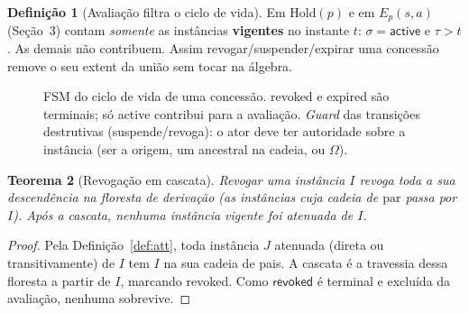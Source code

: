 \documentclass[11pt,a4paper]{article}
\newtheorem{theorem}{Teorema}
\theoremstyle{definition}
\newtheorem{definition}[theorem]{Definição}
\begin{document}
  \begin{definition}[Avaliação filtra o ciclo de vida]
  Em $\mathrm{Hold}(p)$ e em $E_p(s,a)$ (Seção~3) contam \emph{somente} as
  instâncias \textbf{vigentes} no instante $t$: $\sigma=\textsf{active}$ e
  $\tau>t$. As demais não contribuem. Assim revogar/suspender/expirar uma
  concessão remove o seu extent da união sem tocar na álgebra.
  \end{definition}

  \begin{figure}[h]
  \centering
  \caption{FSM do ciclo de vida de uma concessão. \textsf{revoked} e
  \textsf{expired} são terminais; só \textsf{active} contribui para a
  avaliação. \emph{Guard} das transições destrutivas (suspende/revoga): o ator
  deve ter autoridade sobre a instância (ser a origem, um ancestral na cadeia,
  ou $\Omega$).}
  \label{fig:fsm}
  \end{figure}

  \begin{theorem}[Revogação em cascata]\label{thm:cascade}
  Revogar uma instância $I$ revoga toda a sua descendência na floresta de
  derivação (as instâncias cuja cadeia de $\mathrm{par}$ passa por $I$). Após a
  cascata, nenhuma instância vigente foi atenuada de $I$.
  \end{theorem}
  \begin{proof}
  Pela Definição~\ref{def:att}, toda instância $J$ atenuada (direta ou
  transitivamente) de $I$ tem $I$ na sua cadeia de pais. A cascata é a travessia
  dessa floresta a partir de $I$, marcando \textsf{revoked}. Como
  $\textsf{revoked}$ é terminal e excluída da avaliação, nenhuma sobrevive.
  \end{proof}
\end{document}
